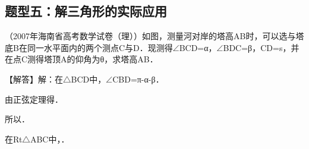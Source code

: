 \subsection{题型五：解三角形的实际应用}

\begin{question}
（2007年海南省高考数学试卷（理））如图，测量河对岸的塔高AB时，可以选与塔底B在同一水平面内的两个测点C与D．现测得$\angle$BCD=α，$\angle$BDC=β，CD=s，并在点C测得塔顶A的仰角为θ，求塔高AB．\par
\begin{center}
\allowbreak{}
\end{center}
\begin{solution}
【解答】解：在$\triangle$BCD中，$\angle$CBD=π-α-β．\par
由正弦定理得\allowbreak{}．\par
所以\allowbreak{}．\par
在Rt$\triangle$ABC中，\allowbreak{}．\par
\end{solution}
\end{question}

